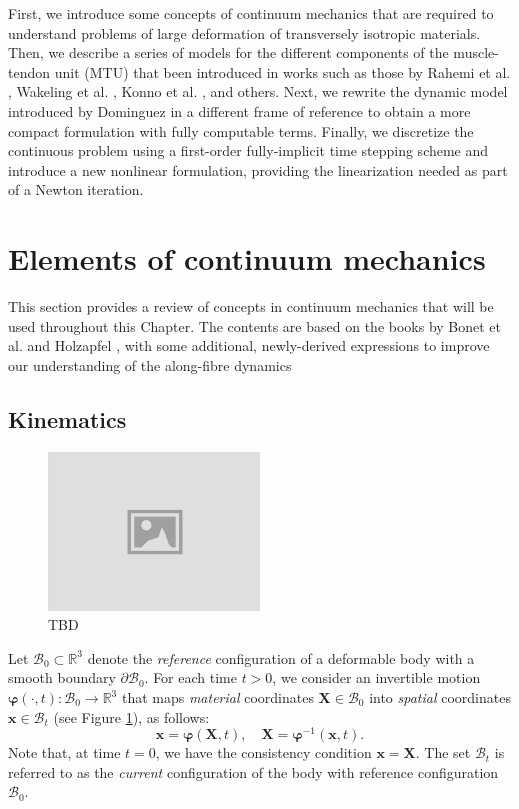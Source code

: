 \documentclass{sfuthesis}
\numberwithin{equation}{section}
\numberwithin{figure}{chapter}
\numberwithin{table}{chapter}
\theoremstyle{definition}
\def\*#1{{\mathbf{#1}}} %
\newcommand{\R}{\mathbb{R}}
\newcommand{\B}{\mathcal{B}}
\def\bphi{{\bm{\varphi}}}
\begin{document}
First, we introduce some concepts of continuum mechanics that are required to understand problems of large deformation of transversely isotropic materials. Then, we describe a series of models for the different components of the muscle-tendon unit (MTU) that been introduced in works such as those by Rahemi et al. \cite{RahemiNigamWakeling2015}, Wakeling et al. \cite{Paper1_WakelingEtAl2020}, Konno et al. \cite{KonnoNigamWakeling2021_ECM}, and others. Next, we rewrite the dynamic model introduced by Dominguez \cite{Seba} in a different frame of reference to obtain a more compact formulation with fully computable terms. Finally, we discretize the continuous problem using a first-order fully-implicit time stepping scheme and introduce a new nonlinear formulation, providing the linearization needed as part of a Newton iteration.

\section{Elements of continuum mechanics}

{\color{blue}This section provides a review of concepts in continuum mechanics that will be used throughout this Chapter. The contents are based on the books by Bonet et al. \cite{BonetGillWood2021Book} and Holzapfel \cite{HolzapfelBook}, with some additional, newly-derived expressions to improve our understanding of the along-fibre dynamics}

\subsection{Kinematics} \label{sec:kinematics}

\begin{figure}
    \centering
    \includegraphics[width=0.50\textwidth]{placeholder-img.jpg}
    \caption{TBD \label{fig:potato_B0_Bt}}
\end{figure}

Let $\B_0 \subset \R^3$ denote the \textit{reference} configuration of a deformable body with a smooth boundary $\partial \B_0$. For each time $t > 0$, we consider an invertible motion $\bphi(\cdot, t):\B_0 \to \R^3$ that maps \textit{material} coordinates $\*X \in \B_0$ into \textit{spatial} coordinates $\*x \in \B_t$ (see Figure \ref{fig:potato_B0_Bt}), as follows:
\begin{equation}
\*x = \bphi(\*X,t), \quad \*X = \bphi^{-1}(\*x,t).
\end{equation}
Note that, at time $t=0$, we have the consistency condition $\*x = \*X$. The set $\B_t$ is referred to as the \textit{current} configuration of the body with reference configuration $\B_0$.
\end{document}
